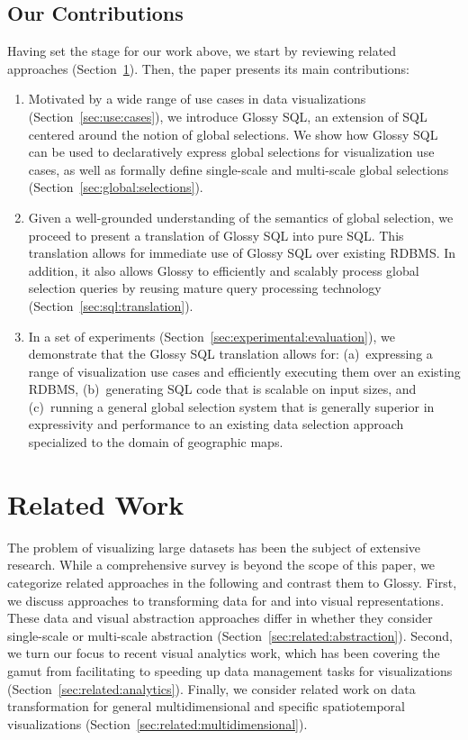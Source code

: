 \documentclass[11pt, oneside]{report}
\begin{document}
\subsection{Our Contributions}

Having set the stage for our work above, we start by reviewing related approaches (Section~\ref{sec:glossy:related:work}). Then, the paper presents its main contributions:

\begin{enumerate}

\item Motivated by a wide range of use cases in data visualizations (Section~\ref{sec:use:cases}), we introduce Glossy SQL, an extension of SQL centered around the notion of global selections. We show how Glossy SQL can be used to declaratively express global selections for visualization use cases, as well as formally define single-scale and multi-scale global selections (Section~\ref{sec:global:selections}).  

\item Given a well-grounded understanding of the semantics of global selection, we proceed to present a translation of Glossy SQL into pure SQL. This translation allows for immediate use of Glossy SQL over existing RDBMS. In addition, it also allows Glossy to efficiently and scalably process global selection queries by reusing mature query processing technology (Section~\ref{sec:sql:translation}). 

\item In a set of experiments (Section~\ref{sec:experimental:evaluation}), we demonstrate that the Glossy SQL translation allows for: (a)~expressing a range of visualization use cases and efficiently executing them over an existing RDBMS, (b)~generating SQL code that is scalable on input sizes, and (c)~running a general global selection system that is generally superior in expressivity and performance to an existing data selection approach specialized to the domain of geographic maps. 

\end{enumerate} 

\section{Related Work}
\label{sec:glossy:related:work}

The problem of visualizing large datasets has been the subject of extensive research. While a comprehensive survey is beyond the scope of this paper, we categorize related approaches in the following and contrast them to Glossy. First, we discuss approaches to transforming data for and into visual representations. These data and visual abstraction approaches differ in whether they consider single-scale or multi-scale abstraction (Section~\ref{sec:related:abstraction}). Second, we turn our focus to recent visual analytics work, which has been covering the gamut from facilitating to speeding up data management tasks for visualizations (Section~\ref{sec:related:analytics}). Finally, we consider related work on data transformation for general multidimensional and specific spatiotemporal visualizations (Section~\ref{sec:related:multidimensional}). 
\end{document}
